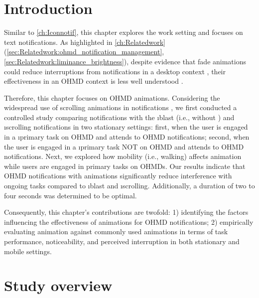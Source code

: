 \section{Introduction} 
\label{sec:Gradnotif:introduction}

Similar to \autoref{ch:Iconnotif}, this chapter explores the work setting and focuses on text notifications. As highlighted in \autoref{ch:Relatedwork} (\autoref{sec:Relatedwork:ohmd_notification_management}, \autoref{sec:Relatedwork:liminance_brightness}), despite evidence that fade animations could reduce interruptions from notifications in a desktop context \cite{mccrickard_establishing_2003, mccrickard_evaluating_2001, maglio_tradeoffs_2000, wilson_gradual_2006}, their effectiveness in an OHMD context is less well understood \cite{faulhaber_priority_dependent_2022}. 

Therefore, this chapter focuses on \fading{} OHMD animations.
Considering the widespread use of scrolling animations in notifications \cite{android_android_2021, maglio_tradeoffs_2000}, we first conducted a controlled study comparing \fading{} notifications with the \i{blast} (i.e., without \fading{}) and \i{scrolling} notifications in two stationary settings: first, when the user is engaged in a \i{primary task on OHMD} and attends to OHMD notifications; second, when the user is engaged in a \i{primary task NOT on OHMD} and attends to OHMD notifications. 
Next, we explored how mobility (i.e., walking) affects \fading{} animation while users are engaged in primary tasks on OHMDs. 
Our results indicate that OHMD notifications with \fading{} animations significantly reduce interference with ongoing tasks compared to \i{blast} and \i{scrolling}. Additionally, a \fading{} duration of two to four seconds was determined to be optimal.

Consequently, this chapter's contributions are twofold: 1) identifying the factors influencing the effectiveness of \fading{} animations for OHMD notifications; 2) empirically evaluating \fading{} animation against commonly used animations in terms of task performance, noticeability, and perceived interruption in both stationary and mobile settings.










\section{Study overview}
\label{sec:Gradnotif:study_overview}

